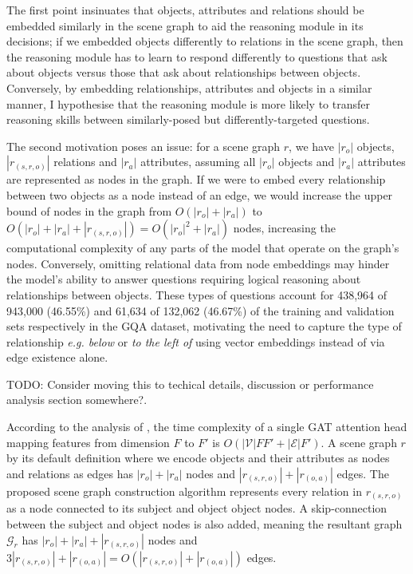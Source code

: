 The first point insinuates that objects, attributes and relations should be embedded similarly in the scene graph to aid the reasoning module in its decisions; if we embedded objects differently to relations in the scene graph, then the reasoning module has to learn to respond differently to questions that ask about objects versus those that ask about relationships between objects. Conversely, by embedding relationships, attributes and objects in a similar manner, I hypothesise that the reasoning module is more likely to transfer reasoning skills between similarly-posed but differently-targeted questions.

The second motivation poses an issue: for a scene graph \(r\), we have \(|r_o|\) objects, \(|r_{(s,r,o)}|\) relations and \(|r_a|\) attributes, assuming all \(|r_o|\) objects and \(|r_a|\) attributes are represented as nodes in the graph. If we were to embed every relationship between two objects as a node instead of an edge, we would increase the upper bound of nodes in the graph from \(O(|r_o| + |r_a|)\) to \(O(|r_o| + |r_a| + |r_{(s,r,o)}|) = O(|r_o|^2 + |r_a|)\) nodes, increasing the computational complexity of any parts of the model that operate on the graph's nodes. Conversely, omitting relational data from node embeddings may hinder the model's ability to answer questions requiring logical reasoning about relationships between objects. These types of questions account for 438,964 of 943,000 (46.55\%) and 61,634 of 132,062 (46.67\%) of the training and validation sets respectively in the GQA dataset, motivating the need to capture the type of relationship \textit{e.g. below} or \textit{to the left of} using vector embeddings instead of via edge existence alone.


{\color{red} TODO: Consider moving this to techical details, discussion or performance analysis section somewhere?.}

According to the analysis of \citeauthor{velivckovic2017graph}, the time complexity of a single GAT attention head mapping features from dimension \(F\) to \(F'\) is \(O(|\mathcal{V}|FF' + |\mathcal{E}|F')\). A scene graph \(r\) by its default definition where we encode objects and their attributes as nodes and relations as edges has \(|r_o| + |r_a|\) nodes and \(|r_{(s, r, o)}| + |r_{(o, a)}|\) edges. The proposed scene graph construction algorithm represents every relation in \(r_{(s, r, o)}\) as a node connected to its subject and object object nodes. A skip-connection between the subject and object nodes is also added, meaning the resultant graph \(\mathcal{G}_r\) has \(|r_o| + |r_a| + |r_{(s, r, o)}|\) nodes and \(3|r_{(s, r, o)}| + |r_{(o, a)}| = O(|r_{(s, r, o)}| + |r_{(o, a)}|)\) edges.

